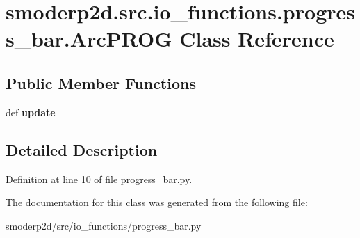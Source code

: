 \hypertarget{classsmoderp2d_1_1src_1_1io__functions_1_1progress__bar_1_1ArcPROG}{\section{smoderp2d.\-src.\-io\-\_\-functions.\-progress\-\_\-bar.\-Arc\-P\-R\-O\-G Class Reference}
\label{classsmoderp2d_1_1src_1_1io__functions_1_1progress__bar_1_1ArcPROG}
}
\subsection*{Public Member Functions}
\begin{DoxyCompactItemize}
\item 
\hypertarget{classsmoderp2d_1_1src_1_1io__functions_1_1progress__bar_1_1ArcPROG_a512dbca9e017ee59cf367f2de6c1bea4}{def {\bfseries update}}\label{classsmoderp2d_1_1src_1_1io__functions_1_1progress__bar_1_1ArcPROG_a512dbca9e017ee59cf367f2de6c1bea4}

\end{DoxyCompactItemize}


\subsection{Detailed Description}


Definition at line 10 of file progress\-\_\-bar.\-py.



The documentation for this class was generated from the following file\-:\begin{DoxyCompactItemize}
\item 
smoderp2d/src/io\-\_\-functions/progress\-\_\-bar.\-py\end{DoxyCompactItemize}
